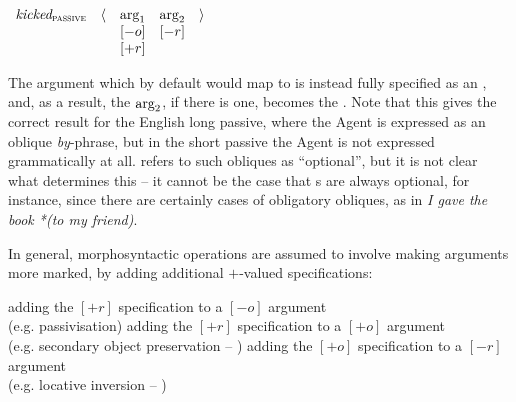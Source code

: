 \documentclass[output=paper]{langscibook}
\begin{document}
\begin{exe}
\ex \label{kick-passive-kibort}
\ensuremath{%
\begin{array}[t]{ccccc}
  \textit{kicked}_\textsc{passive} & \langle & \textnormal{arg}_1 & \ensuremath{\textnormal{arg}_2} & \rangle\\
                                   &  & [-o]   & [-r]   &   \\
                                   &  & [+r]   &        &   \\
\end{array}
}
\end{exe}
%
The argument which by default would map to \SUBJ is instead fully specified as
an \OBLTHETA, and, as a result, the \ensuremath{\textnormal{arg}_2}, if there is
one, becomes the \SUBJ. Note that this gives the correct result for the English
long passive, where the Agent is expressed as an oblique \textit{by}-phrase, but
in the short passive the Agent is not expressed grammatically at all.
\citet[e.g.][29]{Kibort2004} refers to such obliques as ``optional'', but it is
not clear what determines this -- it cannot be the case that \OBLTHETA{}s are
always optional, for instance, since there are certainly cases of obligatory
obliques, as in \textit{I gave the book *(to my friend)}.

In general, morphosyntactic operations are assumed to involve making arguments
more marked, by adding additional $+$-valued specifications:

\begin{exe}
    \ex \label{morphosyntactic-operations}
    \begin{xlist}
    \ex adding the $[+r]$ specification to a $[-o]$ argument \\(e.g. passivisation)%
    \ex adding the $[+r]$ specification to a $[+o]$ argument \\ (e.g. secondary
    object preservation -- \citealt[268]{Kibort2007})%
    \ex adding the $[+o]$ specification to a $[-r]$ argument \\(e.g. locative
    inversion -- \citealt[364--367]{Kibort2004})%
  \end{xlist}
\end{exe}

\end{document}
